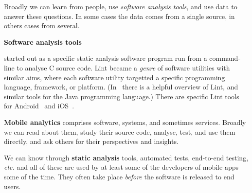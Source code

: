 

Broadly we can learn from people, use \textit{software analysis tools}, and use data to answer these questions. In some cases the data comes from a single source, in others cases from several.

\textbf{Software analysis tools} 

 started out as a specific static analysis software program run from a command-line to analyse C source code. Lint became a \emph{genre} of software utilities with similar aims, where each software utility targetted a specific programming language, framework, or platform. (In~ there is a helpful overview of Lint, and similar tools for the Java programming language.) There are specific Lint tools for Android~ and iOS~.

\textbf{Mobile analytics} comprises software, systems, and sometimes services. Broadly we can read about them, study their source code, analyse, test, and use them directly, and ask others for their perspectives and insights. %

We can know through \textbf{static analysis} tools, automated tests, end-to-end testing, \emph{etc.} and all of these are used by at least some of the developers of mobile apps some of the time. They often take place \textit{before} the software is released to end users.

